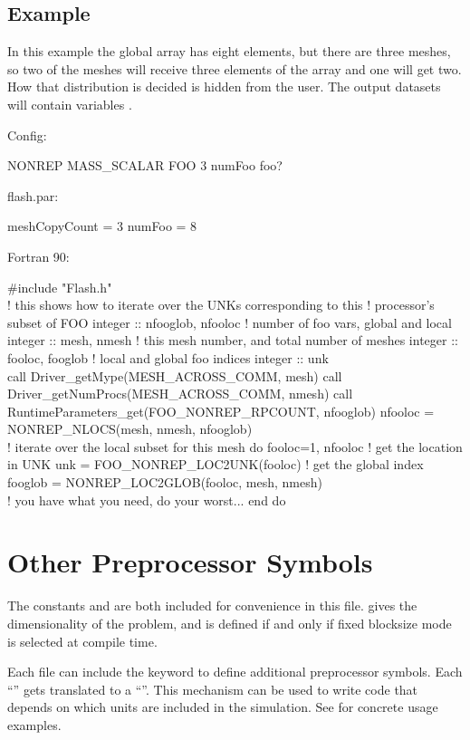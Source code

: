 \subsection{Example}
In this example the global array  has eight elements, but there are three meshes, so
two of the meshes will receive three elements of the array and one will get two.  How
that distribution is decided is hidden from the user.  The output datasets will contain
variables .

Config:
\begin{fcodeseg}
NONREP MASS_SCALAR FOO 3 numFoo foo?
\end{fcodeseg}

flash.par:
\begin{fcodeseg}
meshCopyCount = 3
numFoo = 8
\end{fcodeseg}

Fortran 90:
\begin{fcodeseg}
\#include "Flash.h"\\
! this shows how to iterate over the UNKs corresponding to this 
! processor's subset of FOO
integer :: nfooglob, nfooloc ! number of foo vars, global and local
integer :: mesh, nmesh ! this mesh number, and total number of meshes
integer :: fooloc, fooglob ! local and global foo indices
integer :: unk\\
call Driver_getMype(MESH_ACROSS_COMM, mesh)
call Driver_getNumProcs(MESH_ACROSS_COMM, nmesh)
call RuntimeParameters_get(FOO_NONREP_RPCOUNT, nfooglob)
nfooloc = NONREP_NLOCS(mesh, nmesh, nfooglob)\\
! iterate over the local subset for this mesh
do fooloc=1, nfooloc
    ! get the location in UNK
    unk = FOO_NONREP_LOC2UNK(fooloc)
    ! get the global index
    fooglob = NONREP_LOC2GLOB(fooloc, mesh, nmesh)\\
    ! you have what you need, do your worst...
end do
\end{fcodeseg}

\section{Other Preprocessor Symbols}
\label{Sec:FlashHother}
The constants  and  are both included
for convenience in this file.  gives the dimensionality of
the problem, and  is defined if and only if fixed blocksize mode is
selected at compile time.

Each  file can include the  keyword to
define additional preprocessor symbols. Each ``'' gets translated to a 
``''.
This mechanism can be used to write code that depends on which
units are included in the simulation. 
See  for concrete usage examples.

